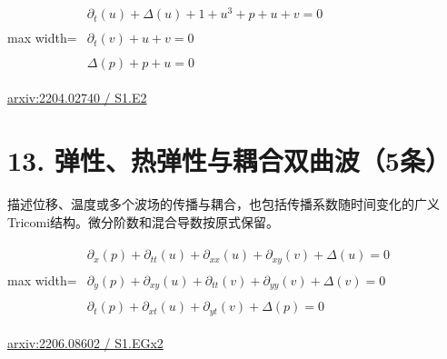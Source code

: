 \documentclass[UTF8,10pt,a4paper,fontset=mac]{ctexart}
\begin{document}
\begin{minipage}{\linewidth}\begin{center}\begin{adjustbox}{max width=\linewidth}$\displaystyle\begin{gathered}\begin{gathered}\partial_{t}(u)+\Delta(u)+1+u^{3}+p+u+v=0\end{gathered}\\[5pt]\begin{gathered}\partial_{t}(v)+u+v=0\end{gathered}\\[5pt]\begin{gathered}\Delta(p)+p+u=0\end{gathered}\end{gathered}$\end{adjustbox}\end{center}{\small\href{https://arxiv.org/html/2204.02740#S1.E2}{arxiv:2204.02740 / S1.E2}}\par\end{minipage}\par\vspace{6mm}

\section*{13. 弹性、热弹性与耦合双曲波（5条）}
描述位移、温度或多个波场的传播与耦合，也包括传播系数随时间变化的广义Tricomi结构。微分阶数和混合导数按原式保留。\par\medskip

\begin{minipage}{\linewidth}\begin{center}\begin{adjustbox}{max width=\linewidth}$\displaystyle\begin{gathered}\begin{gathered}\partial_{x}(p)+\partial_{tt}(u)+\partial_{xx}(u)+\partial_{xy}(v)+\Delta(u)=0\end{gathered}\\[5pt]\begin{gathered}\partial_{y}(p)+\partial_{xy}(u)+\partial_{tt}(v)+\partial_{yy}(v)+\Delta(v)=0\end{gathered}\\[5pt]\begin{gathered}\partial_{t}(p)+\partial_{xt}(u)+\partial_{yt}(v)+\Delta(p)=0\end{gathered}\end{gathered}$\end{adjustbox}\end{center}{\small\href{https://arxiv.org/html/2206.08602#S1.EGx2}{arxiv:2206.08602 / S1.EGx2}}\par\end{minipage}\par\vspace{6mm}
\end{document}

